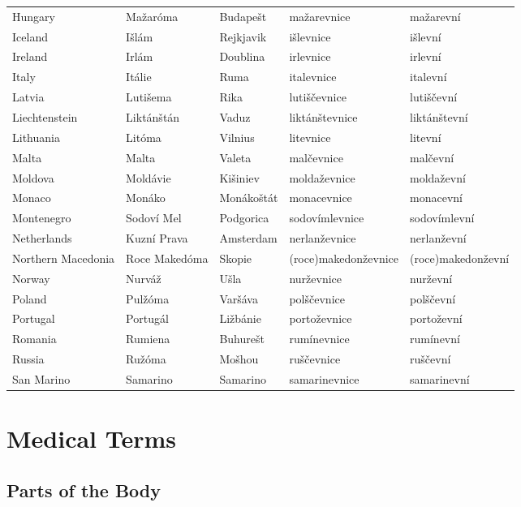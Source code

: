 {\begin{longtabu} {ZZZZZ}
    Hungary             & Mažaróma    & Budapešt  & mažarevnice   & mažarevní\\
    Iceland             & Išlám   & Rejkjavik     & išlevnice & išlevní\\
    Ireland             & Irlám       & Doublina      & irlevnice     & irlevní\\
    Italy               & Itálie      & Ruma          & italevnice    & italevní\\
    Latvia              & Lutišema  & Rika          & lutiščevnice  & lutiščevní\\
    Liechtenstein       & Liktánštán & Vaduz    & liktánštevnice & liktánštevní\\
    Lithuania           & Litóma      & Vilnius       & litevnice     & litevní\\
    Malta               & Malta         & Valeta        & malčevnice    & malčevní\\
    Moldova             & Moldávie    & Kišiniev  & moldaževnice  & moldaževní\\
    Monaco              & Monáko      & Monákoštát    & monacevnice   & monacevní\\
    Montenegro          & Sodoví Mel  & Podgorica     & sodovímlevnice  & sodovímlevní\\
    Netherlands         & Kuzní Prava & Amsterdam     & nerlanževnice & nerlanževní\\
    Northern Macedonia  & Roce Makedóma   & Skopie    & (roce)makedonževnice & (roce)makedonževní\\
    Norway              & Nurváž  & Ušla      & nurževnice    & nurževní\\
    Poland              & Pulžóma & Varšáva & polščevnice   & polščevní\\
    Portugal            & Portugál    & Ližbánie    & portoževnice  & portoževní\\
    Romania             & Rumiena       & Buhurešt  & rumínevnice & rumínevní\\
    Russia              & Ružóma  & Mošhou    & ruščevnice & ruščevní\\
    San Marino          & Samarino      & Samarino      & samarinevnice & samarinevní\\
\bottomrule
\end{longtabu}}
\fi

\section{Medical Terms}
\subsection{Parts of the Body}